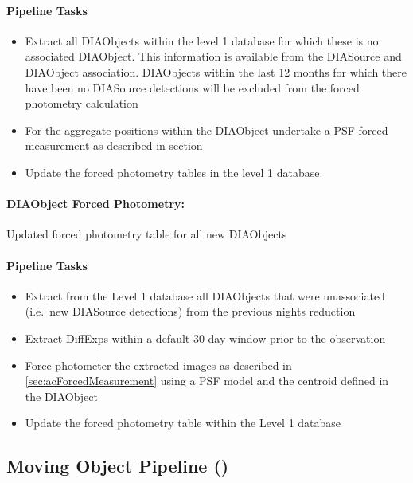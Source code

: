 \paragraph{Pipeline Tasks}

\begin{itemize}
\item Extract all DIAObjects within the level 1 database for which these is no associated DIAObject. This information is available from the DIASource and DIAObject association.  DIAObjects within the last 12 months for which there have been no DIASource detections will be excluded from the forced photometry calculation
\item For the aggregate positions within the DIAObject undertake a PSF forced measurement as described in section \hyperref[sec:acForcedMeasurement]{}
\item Update the forced photometry tables in the level 1 database.
\end{itemize}



\paragraph*{DIAObject Forced Photometry:} 

Updated forced photometry table for all new DIAObjects


\paragraph{Pipeline Tasks}

\begin{itemize}
\item Extract from the Level 1 database all DIAObjects that were unassociated (i.e.\ new DIASource detections) from the previous nights reduction
\item Extract DiffExps within a  default 30 day window prior to the observation
\item Force photometer the extracted images as described in \ref{sec:acForcedMeasurement} using a PSF model and the centroid defined in the DIAObject
\item Update the forced photometry table within the Level 1 database
\end{itemize}
\clearpage



\subsection{Moving Object Pipeline (\wbsMOPS)}

